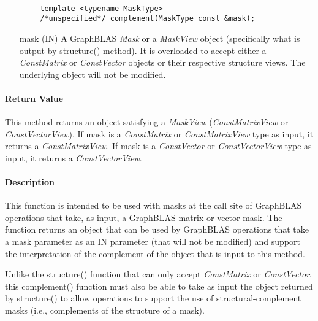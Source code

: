 \paragraph{\syntax}

\begin{verbatim}
        template <typename MaskType>
        /*unspecified*/ complement(MaskType const &mask);
\end{verbatim}

\begin{itemize}%
    \item[{\sf mask}] ({\sf IN}) A GraphBLAS \emph{Mask} or a \emph{MaskView}
    object (specifically what is output by structure() method). It is 
    overloaded to accept either a \emph{ConstMatrix} or \emph{ConstVector} 
    objects or their respective structure views.  The underlying object will 
    not be modified.
\end{itemize}

\paragraph{Return Value}

This method returns an object satisfying a \emph{MaskView} (\emph{ConstMatrixView} or 
\emph{ConstVectorView}). If {\sf mask} is a \emph{ConstMatrix} or \emph{ConstMatrixView} type as input, 
it returns a \emph{ConstMatrixView}.  If {\sf mask} is a \emph{ConstVector} or  \emph{ConstVectorView}
type as input, it returns a \emph{ConstVectorView}.  

\paragraph{Description}

This function is intended to be used with masks at the call site of GraphBLAS 
operations that take, as input, a GraphBLAS matrix or vector mask.  The function 
returns an object that can be used by GraphBLAS operations that take a mask 
parameter as an {\sf IN} parameter (that will not be modified) and support the 
interpretation of the complement of the object that is input to this method.

Unlike the {\sf structure()} function that can only accept \emph{ConstMatrix} or 
\emph{ConstVector}, this {\sf complement()} function must also be able to take as
input the object returned by {\sf structure()} to allow operations to support the
use of structural-complement masks (i.e., complements of the structure of a mask).

